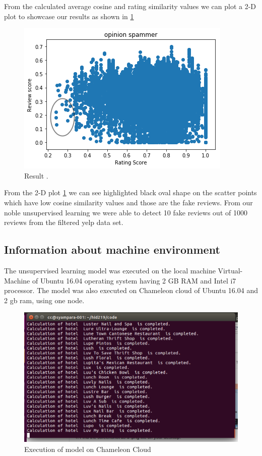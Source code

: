 \documentclass[sigconf]{acmart}
\begin{document}
From the calculated average cosine and rating similarity values we can plot a 2-D plot to showcase our results as shown in \ref{f:op}

\begin{figure}[!ht]
  \centering\includegraphics[width=\columnwidth]{images/sample.png}
  \caption{Result \cite{originalPaper}.}\label{f:op}
\end{figure}
From the 2-D plot \ref{f:op} we can see highlighted black oval shape on the scatter points which have low cosine similarity values and those are the fake reviews. From our noble unsupervised learning we were able to detect 10 fake reviews out of 1000 reviews from the filtered yelp data set.

\subsection{Information about machine environment}
The unsupervised learning model was executed on the local machine Virtual-Machine of Ubuntu 16.04 operating system having 2 GB RAM and Intel i7 processor. The model was also executed on Chameleon cloud of Ubuntu 16.04 and 2 gb ram, using one node.

\begin{figure}[!ht]
  \centering\includegraphics[width=\columnwidth]{images/chamcloud.png}
  \caption{Execution of model on Chameleon Cloud}\label{f:chameleon}
\end{figure}
\end{document}
